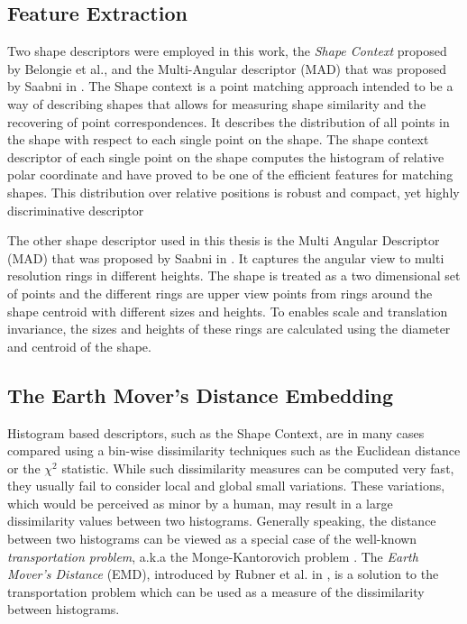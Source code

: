 \documentclass[10pt, conference, compsocconf]{IEEEtran}
\begin{document}
\subsection{Feature Extraction}
Two shape descriptors were employed in this work, the \emph{Shape Context} \cite{belongie2002shape} proposed by Belongie et al., and the Multi-Angular descriptor (MAD) that was proposed by Saabni in \cite{saabni2013multi}.
The Shape context is a point matching approach intended to be a way of describing shapes that allows for measuring shape similarity and the recovering of point correspondences. 
It describes the distribution of all points in the shape with respect to each single point on the shape.
The shape context descriptor of each single point on the shape computes the histogram of relative polar coordinate and have proved to be one of the efficient features for matching shapes.
This distribution over relative positions is robust and compact, yet highly discriminative descriptor

The other shape descriptor used in this thesis is the Multi Angular Descriptor (MAD) that was proposed by Saabni in \cite{saabni2013multi}. 
It captures the angular view to multi resolution rings in different heights. 
The shape is treated as a two dimensional set of points and the different rings are upper view points from rings around the shape centroid with different sizes and heights. 
To enables scale and translation invariance, the sizes and heights of these rings are calculated using the diameter and centroid of the shape.

\subsection{The Earth Mover's Distance Embedding}
Histogram based descriptors, such as the Shape Context, are in many cases compared using a bin-wise dissimilarity techniques such as the Euclidean distance or the $\chi^2$ statistic.
While such dissimilarity measures can be computed very fast, they usually fail to consider local and global small variations. 
These variations, which would be perceived as minor by a human, may result in a large dissimilarity values between two histograms. 
Generally speaking, the distance between two histograms can be viewed as a special case of the well-known \emph{transportation problem}, a.k.a the Monge-Kantorovich problem \cite{rachev1985monge}.
The \emph{Earth Mover's Distance} (EMD), introduced by Rubner et al. in \cite{rubner2000earth}, is a solution to the transportation problem which can be used as a measure of the dissimilarity between histograms. 
\end{document}
